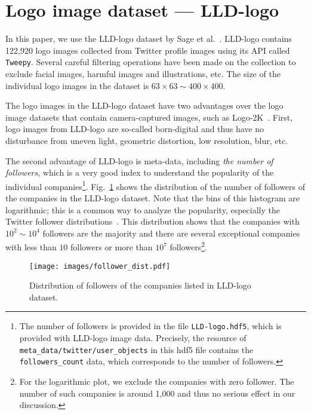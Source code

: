 \documentclass[runningheads]{llncs}
\begin{document}
\section{Logo image dataset --- LLD-logo\cite{Sage:2018}\label{sec:data}}
In this paper, we use the LLD-logo dataset by Sage et al.~\cite{Sage:2018}. LLD-logo contains 122,920 logo images collected from Twitter profile images using its API called {\tt Tweepy}. Several careful filtering operations have been made on the collection to exclude facial images, harmful images and illustrations, etc. 
The size of the individual logo images in the dataset is $63\times63 \sim 400\times 400$.
\par
The logo images in the LLD-logo dataset have two advantages over the logo image datasets that contain camera-captured images, such as Logo-2K~\cite{wang2020logo}. First, logo images from LLD-logo are so-called born-digital and thus have no disturbance from uneven light, geometric distortion, low resolution, blur, etc.\par
%
The second advantage of LLD-logo is meta-data, including {\it the number of followers}, which is a very good index to understand the popularity of the individual companies\footnote{The number of followers is provided in the file {\tt LLD-logo.hdf5}, which is provided with LLD-logo image data. Precisely, the resource of {\tt meta\_data/twitter/user\_objects} in this hdf5 file contains the {\tt followers\_count} data, which corresponds to the number of followers.}. Fig.~\ref{fig:popu_dist} shows the distribution of the number of followers of the companies in the LLD-logo dataset. Note that the bins of this histogram are logarithmic; this is a common way to analyze the popularity, especially the Twitter follower distributions~\cite{ardon2011spatio,bakshy2011everyone,lerman2012social,stringhini2013follow}. This distribution shows that the companies with $10^2\sim10^4$ followers are the majority and there are several exceptional companies with less than $10$ followers or more than $10^7$ followers\footnote{For the logarithmic plot, we exclude the companies with zero follower. The number of such companies is around 1,000 and thus no serious effect in our discussion.}.
\par
\begin{figure}[t]
    \centering
    \texttt{[image: images/follower\_dist.pdf]}\\[-5mm]
    \caption{Distribution of followers of the companies listed in LLD-logo dataset.}
    \label{fig:popu_dist}
\end{figure}
\end{document}
